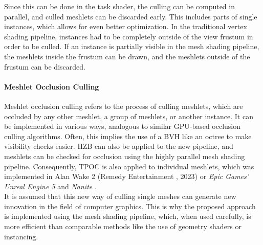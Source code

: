 \noindent
Since this can be done in the task shader, the culling can be computed in parallel, and culled meshlets can 
be discarded early. This includes parts of single instances, which allows for even better optimization. In 
the traditional vertex shading pipeline, instances had to be completely outside of the view frustum in order 
to be culled. If an instance is partially visible in the mesh shading pipeline, the meshlets inside the frustum 
can be drawn, and the meshlets outside of the frustum can be discarded.


\paragraph*{Meshlet Occlusion Culling} \label{subsubsec-meshlet-occlusion-culling}

Meshlet occlusion culling refers to the process of culling meshlets, which are occluded by any other meshlet, a 
group of meshlets, or another instance. It can be implemented in various ways, analogous to similar \ac{GPU}-based 
occlusion culling algorithms. Often, this implies the use of a \ac{BVH} like an octree to make visibility checks 
easier. \ac{HZB} can also be applied to the new pipeline, and meshlets can be checked for occlusion using the 
highly parallel mesh shading pipeline. Consequently, \ac{TPOC} is also applied to individual meshlets, which was 
implemented in Alan Wake 2 (Remedy Entertainment \cite{Remedy2023}, 2023) or \emph{Epic Games'} \emph{Unreal Engine 5} and 
\emph{Nanite} \cite{Karis2021}. \\

\noindent
It is assumed that this new way of culling single meshes can generate new innovation in the field of computer graphics.
This is why the proposed approach is implemented using the mesh shading pipeline, which, when used carefully, is more 
efficient than comparable methods like the use of geometry shaders or instancing.